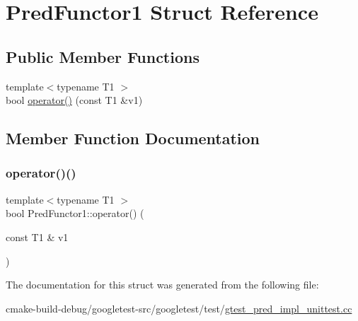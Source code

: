 \hypertarget{structPredFunctor1}{}\section{Pred\+Functor1 Struct Reference}
\label{structPredFunctor1}
\subsection*{Public Member Functions}
\begin{DoxyCompactItemize}
\item 
{\footnotesize template$<$typename T1 $>$ }\\bool \mbox{\hyperlink{structPredFunctor1_a78d81d1bac0ee7f81ea631c49bfab3e2}{operator()}} (const T1 \&v1)
\end{DoxyCompactItemize}


\subsection{Member Function Documentation}
\mbox{\label{structPredFunctor1_a78d81d1bac0ee7f81ea631c49bfab3e2}} 
\subsubsection{\texorpdfstring{operator()()}{operator()()}}
{\footnotesize\ttfamily template$<$typename T1 $>$ \\
bool Pred\+Functor1\+::operator() (\begin{DoxyParamCaption}\item[{const T1 \&}]{v1 }\end{DoxyParamCaption})\hspace{0.3cm}{\ttfamily [inline]}}



The documentation for this struct was generated from the following file\+:\begin{DoxyCompactItemize}
\item 
cmake-\/build-\/debug/googletest-\/src/googletest/test/\mbox{\hyperlink{gtest__pred__impl__unittest_8cc}{gtest\+\_\+pred\+\_\+impl\+\_\+unittest.\+cc}}\end{DoxyCompactItemize}
